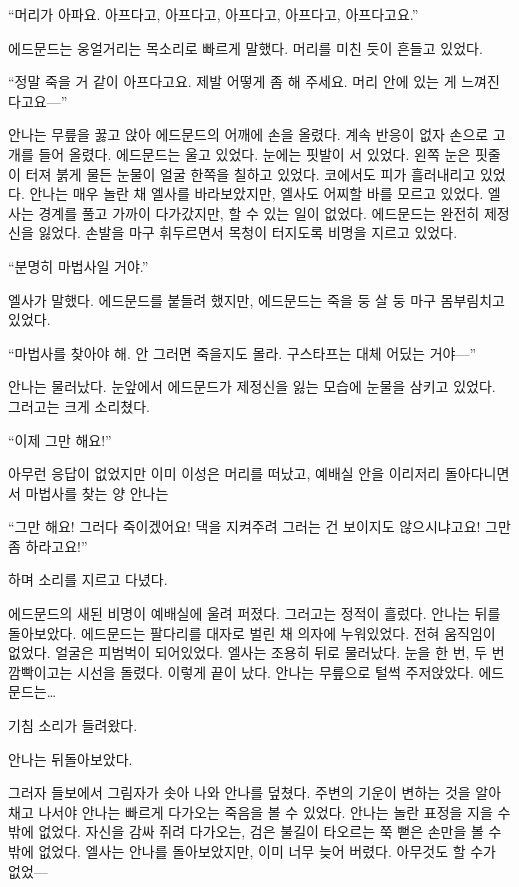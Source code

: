 ``머리가 아파요. 아프다고, 아프다고, 아프다고, 아프다고, 아프다고요.''

에드문드는 웅얼거리는 목소리로 빠르게 말했다. 머리를 미친 듯이 흔들고 있었다.

``정말 죽을 거 같이 아프다고요. 제발 어떻게 좀 해 주세요. 머리 안에 있는 게 느껴진다고요—''

안나는 무릎을 꿇고 앉아 에드문드의 어깨에 손을 올렸다. 계속 반응이 없자 손으로 고개를 들어 올렸다. 에드문드는 울고 있었다. 눈에는 핏발이 서 있었다. 왼쪽 눈은 핏줄이 터져 붉게 물든 눈물이 얼굴 한쪽을 칠하고 있었다. 코에서도 피가 흘러내리고 있었다. 안나는 매우 놀란 채 엘사를 바라보았지만, 엘사도 어찌할 바를 모르고 있었다. 엘사는 경계를 풀고 가까이 다가갔지만, 할 수 있는 일이 없었다. 에드문드는 완전히 제정신을 잃었다. 손발을 마구 휘두르면서 목청이 터지도록 비명을 지르고 있었다.

``분명히 마법사일 거야.''

엘사가 말했다. 에드문드를 붙들려 했지만, 에드문드는 죽을 둥 살 둥 마구 몸부림치고 있었다.

``마법사를 찾아야 해. 안 그러면 죽을지도 몰라. 구스타프는 대체 어딨는 거야—''

안나는 물러났다. 눈앞에서 에드문드가 제정신을 잃는 모습에 눈물을 삼키고 있었다. 그러고는 크게 소리쳤다.

``이제 그만 해요!''

아무런 응답이 없었지만 이미 이성은 머리를 떠났고, 예배실 안을 이리저리 돌아다니면서 마법사를 찾는 양 안나는

``그만 해요! 그러다 죽이겠어요! 댁을 지켜주려 그러는 건 보이지도 않으시냐고요! 그만 좀 하라고요!''

하며 소리를 지르고 다녔다.

에드문드의 새된 비명이 예배실에 울려 퍼졌다. 그러고는 정적이 흘렀다. 안나는 뒤를 돌아보았다. 에드문드는 팔다리를 대자로 벌린 채 의자에 누워있었다. 전혀 움직임이 없었다. 얼굴은 피범벅이 되어있었다. 엘사는 조용히 뒤로 물러났다. 눈을 한 번, 두 번 깜빡이고는 시선을 돌렸다. 이렇게 끝이 났다. 안나는 무릎으로 털썩 주저앉았다. 에드문드는\ldots

기침 소리가 들려왔다.

안나는 뒤돌아보았다.

그러자 들보에서 그림자가 솟아 나와 안나를 덮쳤다. 주변의 기운이 변하는 것을 알아채고 나서야 안나는 빠르게 다가오는 죽음을 볼 수 있었다. 안나는 놀란 표정을 지을 수밖에 없었다. 자신을 감싸 쥐려 다가오는, 검은 불길이 타오르는 쭉 뻗은 손만을 볼 수밖에 없었다. 엘사는 안나를 돌아보았지만, 이미 너무 늦어 버렸다. 아무것도 할 수가 없었—

